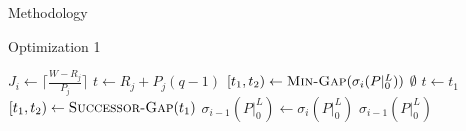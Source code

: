 \documentclass{article}
\begin{document}
\begin{section}{Methodology}
\begin{subsection}{Optimization 1}
    \begin{algorithm}[H]
      \caption{Gap-Tranformation Algorithm Optimization 1: No Zero Gaps Reinserted}\label{gapxfrm2}
      \begin{algorithmic}[2]
          \State $J_{i} \gets \lceil\frac{W - R_{j}}{P_{j}}\rceil$
            \State $t \gets R_{j} + P_{j}(q-1)$
            \State $[t_{1},t_{2}) \gets \Call{Min-Gap}{\sigma_{i}(P|_{0}^{L})}$
            \While{$[t_{1},t_{2}) \not= \Call{Nil}{\sigma_{i}(P|_{0}^{L})}$}
                \State \Return $\emptyset$
              \EndIf
                \State $t \gets t_{1}$
              \EndIf
                \State \Call{Gap-Delete}{$\sigma_{i}(P|_{0}^{L}), [t_{1},t_{2})$}
                    \State \Call{Gap-Insert}{$\sigma_{i}(P|_{0}^{L}), [t_{1},t)$}
                  \NewEndIf
                  \ExitWhile
                \EndIf
                      \State \Call{Gap-Insert}{$\sigma_{i}(P|_{0}^{L}), [t_{1},t)$}
                    \NewEndIf
                  \State \Call{Gap-Insert}{$\sigma_{i}(P|_{0}^{L}), [t + C_{j},t_{2})$}
                  \ExitWhile
                \EndIf
                    \State \Call{Gap-Insert}{$\sigma_{i}(P|_{0}^{L}), [t_{1},t)$}
                  \NewEndIf
                \EndIf                  
              \EndIf
              \State $[t_{1},t_{2}) \gets \Call{Successor-Gap}{t_{1}}$
            \EndWhile
          \EndFor
          \State $\sigma_{i-1}(P|_{0}^{L}) \gets \sigma_{i}(P|_{0}^{L})$
          \State \Return $\sigma_{i-1}(P|_{0}^{L})$
        \EndFunction
      \end{algorithmic}
      \end{algorithm}
  \end{subsection}


\end{section}
\end{document}
